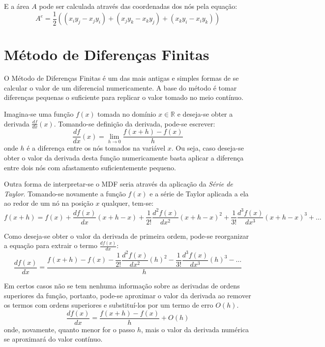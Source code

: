 E a área $A$ pode ser calculada através das coordenadas dos nós pela equação:
\begin{equation}
    A^e = \dfrac{1}{2} (
        (x_i y_j - x_j y_i) +
        (x_j y_k - x_k y_j) +
        (x_k y_i - x_i y_k)
    )
\end{equation}


\section{\textbf{Método de Diferenças Finitas}}
\label{mdf}
O Método de Diferenças Finitas é um das mais antigas e simples formas de se calcular o valor de um diferencial numericamente.
A base do método é tomar diferenças pequenas o suficiente para replicar o valor tomado no meio contínuo.

Imagina-se uma função $f(x)$ tomada no domínio $x \in \mathbb{R}$ e deseja-se obter a derivada $\tfrac{df}{dx}(x)$.
Tomando-se definição da derivada, pode-se escrever:
\begin{equation}
    \dfrac{df}{dx}(x) = \lim_{h\to0} \dfrac{f(x+h)-f(x)}{h}
    \label{derivative}
\end{equation}
onde $h$ é a diferença entre os nós tomados na variável $x$.
Ou seja, caso deseja-se obter o valor da derivada desta função numericamente basta aplicar a diferença entre dois nós com afastamento suficientemente pequeno.

Outra forma de interpretar-se o MDF seria através da aplicação da \textit{Série de Taylor}.
Tomando-se novamente a função $f(x)$ e a série de Taylor aplicada a ela ao redor de um nó na posição $x$ qualquer, tem-se:
\begin{equation}
    f(x + h) =
    f(x) +
    \dfrac{df(x)}{dx}(x + h - x) +
    \dfrac{1}{2!}\dfrac{d^2f(x)}{dx^2}(x + h - x)^2 +
    \dfrac{1}{3!}\dfrac{d^3f(x)}{dx^3}(x + h - x)^3 +
    \ldots
\end{equation}

Como deseja-se obter o valor da derivada de primeira ordem, pode-se reorganizar a equação para extrair o termo $\tfrac{df(x)}{dx}$:
\begin{equation}
    \dfrac{df(x)}{dx} =
    \frac{
        f(x + h) -
        f(x) -
        \dfrac{1}{2!}\dfrac{d^2f(x)}{dx^2}(h)^2 -
        \dfrac{1}{3!}\dfrac{d^3f(x)}{dx^3}(h)^3 -
        \ldots
    }{h}
\end{equation}

Em certos casos não se tem nenhuma informação sobre as derivadas de ordens superiores da função, portanto, pode-se aproximar o valor da derivada ao remover os termos com ordens superiores e substituí-los por um termo de erro $O(h)$.
\begin{equation}
    \dfrac{df(x)}{dx} =
    \frac{
        f(x + h) -
        f(x)
    }{h} +
    O(h)
    \label{dif}
\end{equation}
onde, novamente, quanto menor for o passo $h$, mais o valor da derivada numérica se aproximará do valor contínuo.


